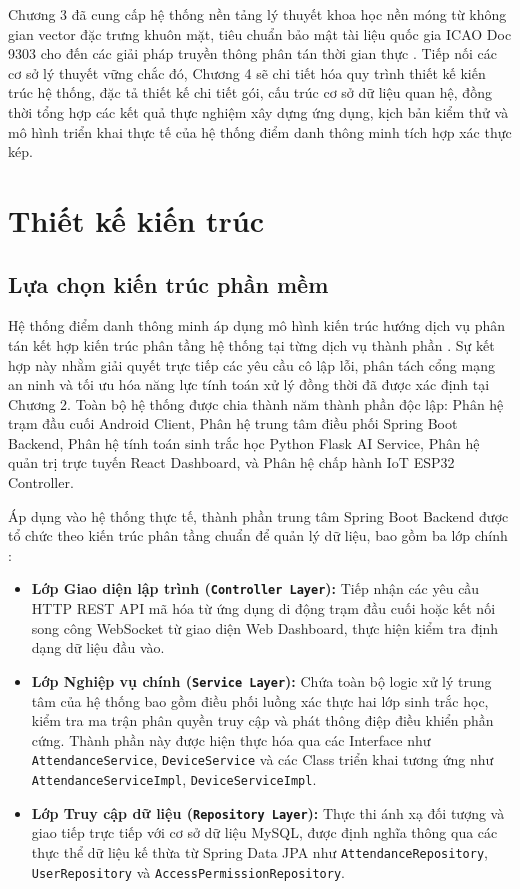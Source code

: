﻿\documentclass[../DoAn.tex]{subfiles}
\begin{document}
Chương 3 đã cung cấp hệ thống nền tảng lý thuyết khoa học nền móng từ không gian vector đặc trưng khuôn mặt, tiêu chuẩn bảo mật tài liệu quốc gia ICAO Doc 9303 cho đến các giải pháp truyền thông phân tán thời gian thực \cite{icao9303, rfc6455, mqtt5}. Tiếp nối các cơ sở lý thuyết vững chắc đó, Chương 4 sẽ chi tiết hóa quy trình thiết kế kiến trúc hệ thống, đặc tả thiết kế chi tiết gói, cấu trúc cơ sở dữ liệu quan hệ, đồng thời tổng hợp các kết quả thực nghiệm xây dựng ứng dụng, kịch bản kiểm thử và mô hình triển khai thực tế của hệ thống điểm danh thông minh tích hợp xác thực kép.

\section{Thiết kế kiến trúc}
\label{section:4.1}

\subsection{Lựa chọn kiến trúc phần mềm}

Hệ thống điểm danh thông minh áp dụng mô hình kiến trúc hướng dịch vụ phân tán kết hợp kiến trúc phân tầng hệ thống tại từng dịch vụ thành phần \cite{fielding2000}. Sự kết hợp này nhằm giải quyết trực tiếp các yêu cầu cô lập lỗi, phân tách cổng mạng an ninh và tối ưu hóa năng lực tính toán xử lý đồng thời đã được xác định tại Chương 2. Toàn bộ hệ thống được chia thành năm thành phần độc lập: Phân hệ trạm đầu cuối Android Client, Phân hệ trung tâm điều phối Spring Boot Backend, Phân hệ tính toán sinh trắc học Python Flask AI Service, Phân hệ quản trị trực tuyến React Dashboard, và Phân hệ chấp hành IoT ESP32 Controller.

Áp dụng vào hệ thống thực tế, thành phần trung tâm Spring Boot Backend được tổ chức theo kiến trúc phân tầng chuẩn để quản lý dữ liệu, bao gồm ba lớp chính \cite{springboot3}:
\begin{itemize}
    \item \textbf{Lớp Giao diện lập trình (\texttt{Controller Layer}):} Tiếp nhận các yêu cầu HTTP REST API mã hóa từ ứng dụng di động trạm đầu cuối hoặc kết nối song công WebSocket từ giao diện Web Dashboard, thực hiện kiểm tra định dạng dữ liệu đầu vào.
    \item \textbf{Lớp Nghiệp vụ chính (\texttt{Service Layer}):} Chứa toàn bộ logic xử lý trung tâm của hệ thống bao gồm điều phối luồng xác thực hai lớp sinh trắc học, kiểm tra ma trận phân quyền truy cập và phát thông điệp điều khiển phần cứng. Thành phần này được hiện thực hóa qua các Interface như \texttt{AttendanceService}, \texttt{DeviceService} và các Class triển khai tương ứng như \texttt{AttendanceServiceImpl}, \texttt{DeviceServiceImpl}.
    \item \textbf{Lớp Truy cập dữ liệu (\texttt{Repository Layer}):} Thực thi ánh xạ đối tượng và giao tiếp trực tiếp với cơ sở dữ liệu MySQL, được định nghĩa thông qua các thực thể dữ liệu kế thừa từ Spring Data JPA như \texttt{AttendanceRepository}, \texttt{UserRepository} và \texttt{AccessPermissionRepository}.
\end{itemize}
\end{document}
